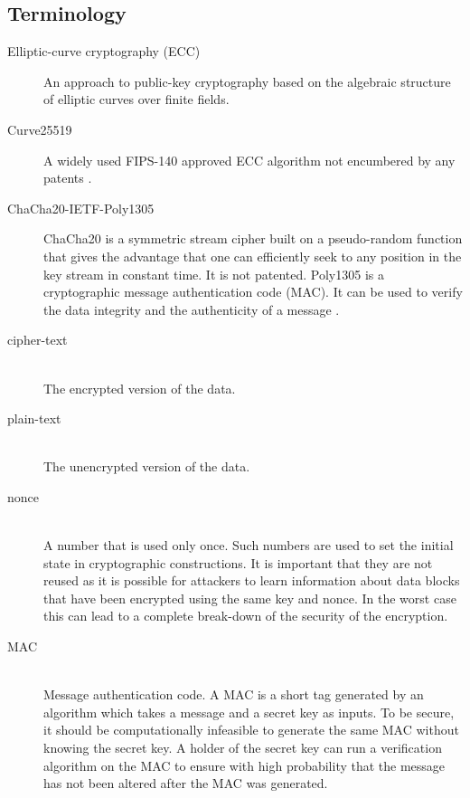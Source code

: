 \documentclass[10pt]{article}
\begin{document}
\subsection{Terminology}
\begin{description}
\item[Elliptic-curve cryptography (ECC)]
An approach to public-key cryptography based on the algebraic structure of elliptic curves over finite fields.

\item[Curve25519]
A widely used FIPS-140 approved ECC algorithm not encumbered by any patents \cite{RFC7748}.

\item[ChaCha20-IETF-Poly1305]
ChaCha20 is a symmetric stream cipher built on a pseudo-random function that gives the advantage that one can
efficiently seek to any position in the key stream in constant time.
It is not patented.
Poly1305 is a cryptographic message authentication code (MAC).
It can be used to verify the data integrity and the authenticity of a message \cite{RFC8439}.

\item[cipher-text]~\\
The encrypted version of the data.

\item[plain-text]~\\
The unencrypted version of the data.

\item[nonce]~\\
A number that is used only once.
Such numbers are used to set the initial state in cryptographic constructions.
It is important that they are not reused as it is possible for attackers to learn information about data blocks that
have been encrypted using the same key and nonce.
In the worst case this can lead to a complete break-down of the security of the encryption.

\item[MAC]~\\
Message authentication code.
A MAC is a short tag generated by an algorithm which takes a message and a secret key as inputs.
To be secure, it should be computationally infeasible to generate the same MAC without knowing the secret key.
A holder of the secret key can run a verification algorithm on the MAC to ensure with high probability that the
message has not been altered after the MAC was generated.

\end{description}
\end{document}
